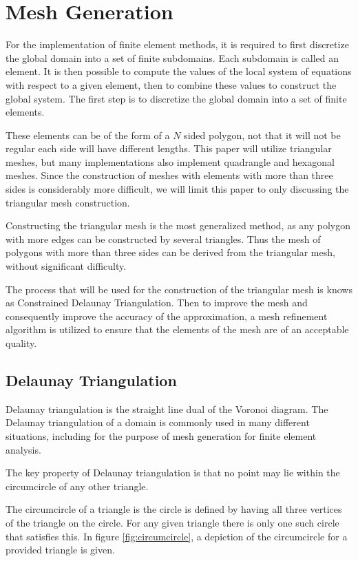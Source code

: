 \documentclass[../fem.tex]{subfile}
\begin{document}
\section{Mesh Generation}%
\label{sec:mesh_generation}

For the implementation of finite element methods, it is required to first
discretize the global domain into a set of finite subdomains. Each subdomain is
called an element. It is then possible to compute the values of the local
system of equations with respect to a given element, then to combine these
values to construct the global system. The first step is to discretize the
global domain into a set of finite elements.

These elements can be of the form of a $N$ sided polygon, not that it will not
be regular each side will have different lengths. This paper will utilize
triangular meshes, but many implementations also implement quadrangle and
hexagonal meshes. Since the construction of meshes with elements with more than
three sides is considerably more difficult, we will limit this paper to only
discussing the triangular mesh construction.

Constructing the triangular mesh is the most generalized method, as any polygon
with more edges can be constructed by several triangles. Thus the mesh of
polygons with more than three sides can be derived from the triangular mesh,
without significant difficulty.

The process that will be used for the construction of the triangular mesh is
knows as Constrained Delaunay Triangulation. Then to improve the mesh and
consequently improve the accuracy of the approximation, a mesh refinement
algorithm is utilized to ensure that the elements of the mesh are of an
acceptable quality.

\subsection{Delaunay Triangulation}%
\label{sub:delaunay_triangulation}

Delaunay triangulation is the straight line dual of the Voronoi diagram. The
Delaunay triangulation of a domain is commonly used in many different
situations, including for the purpose of mesh generation for finite element
analysis.

The key property of Delaunay triangulation is that no point may lie within the
circumcircle of any other triangle.

\begin{definition}[Circumcircle]
  The circumcircle of a triangle is the circle is defined by having all three
  vertices of the triangle on the circle. For any given triangle there is only
  one such circle that satisfies this. In figure \ref{fig:circumcircle}, a
  depiction of the circumcircle for a provided triangle is given.
\end{definition}
\end{document}
